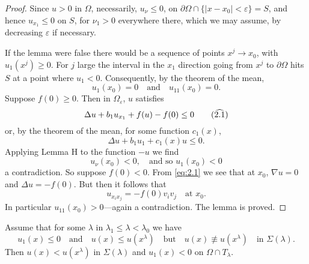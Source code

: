 \begin{proof}
  Since $u>0$ in $\Omega$, necessarily, $u_\nu \leq 0$, 
  on $\partial\Omega\cap\{|x-x_0|<\varepsilon\}=S$, and hence $u_{x_1}\leq 0$ on $S$,
  for $\nu_1>0$ everywhere there, which we may assume, by decreasing $\varepsilon$
  if necessary.

  If the lemma were false there would be a sequence of points $x^j\to x_0$,
  with $u_1(x^j)\geq 0$. For $j$ large the interval in the $x_1$ direction
  going from $x^j$ to $\partial\Omega$ hits $S$ at a point where $u_1<0$.
  Consequently, by the theorem of the mean,
  \[u_1(x_0)=0\quad\text{and}\quad u_{11}(x_0) = 0.\]
  Suppose $f(0)\geq 0$. Then in $\Omega_\varepsilon$, $u$ satisfies
  \begin{equation}\label{eq:2.1hat}
    \Delta u + b_1u_{x_1} + f(u) - f(0) \leq 0 \tag{$\widehat{2.1}$}
  \end{equation}
  or, by the theorem of the mean, for some function $c_1(x)$,
  \[\Delta u + b_1u_1 + c_1(x)u \leq 0.\]
  Applying Lemma H to the function $-u$ we find
  \[u_\nu(x_0) < 0, \quad \text{and so } u_1(x_0) < 0\]
  a contradiction. So suppose $f(0)<0$.
  From \eqref{eq:2.1} we see that at $x_0$, $\nabla u = 0$
  and $\Delta u = -f(0)$. But then it follows that
  \[u_{x_ix_j} = -f(0)v_iv_j\quad\text{at } x_0.\]
  In particular $u_{11}(x_0)>0$---again a contradiction. The lemma is proved.
\end{proof}

\begin{lemma}\label{lemma:2.2}
  Assume that for some $\lambda$ in $\lambda_1\leq \lambda<\lambda_0$ we have
  \begin{equation}\label{eq:2.2prime}
    u_1(x)\leq 0\quad\text{and}\quad u(x)\leq u(x^\lambda)\quad
    \text{but}\quad u(x)\not\equiv u(x^\lambda)\quad \text{in } \Sigma(\lambda).
    \tag{$2.2'$}
  \end{equation}
  Then $u(x)<u(x^\lambda)$ in $\Sigma(\lambda)$ and $u_1(x)<0$ on $\Omega\cap T_\lambda$.
\end{lemma}

